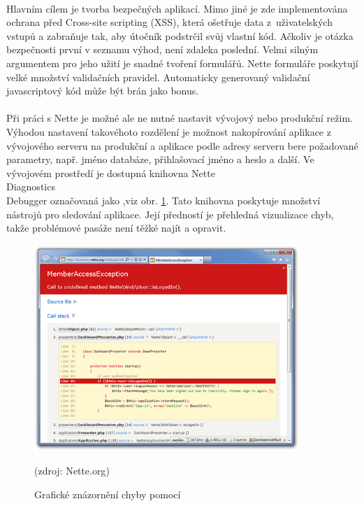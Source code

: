 \documentclass[11pt,a4paper,titlepage,oneside]{book}
\begin{document}
			\paragraph{} Hlavním cílem je tvorba bezpečných aplikací. Mimo jiné je zde implementována ochrana před Cross-site scripting (XSS), která ošetřuje data z~uživatelských vstupů a zabraňuje tak, aby útočník podstrčil svůj vlastní kód. Ačkoliv je otázka bezpečnosti první v seznamu výhod, není zdaleka poslední. Velmi silným argumentem pro jeho užití je snadné tvoření formulářů. Nette formuláře poskytují velké množství validačních pravidel. Automaticky generovaný validační javascriptový kód může být brán jako bonus.

			\label{par:ladenka}
			\paragraph{} Při práci s Nette je možné ale ne nutné nastavit vývojový nebo produkční režim. Výhodou nastavení takovéhoto rozdělení je možnost nakopírování aplikace z vývojového serveru na produkční a aplikace podle adresy serveru bere požadované parametry, např. jméno databáze, přihlašovací jméno a heslo a další. Ve vývojovém prostředí je dostupná knihovna Nette\\Diagnostics\\Debugger označovaná jako ,viz obr. \ref{fig:ladenka}. Tato knihovna poskytuje množství nástrojů pro sledování aplikace. Její předností je přehledná vizualizace chyb, takže problémové pasáže není těžké najít a opravit.
		\begin{figure}[!h]
			\begin{center}
				\includegraphics[width=10cm]{obrazky/ladenka.png}
				\caption{Grafické znázornění chyby pomocí }
				\label{fig:ladenka}
				(zdroj: Nette.org\cite{nette_web})
			\end{center}
		\end{figure}	
\end{document}
